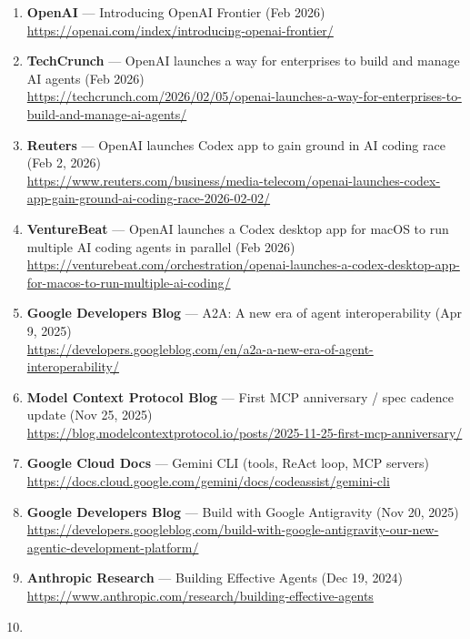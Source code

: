 \documentclass[11pt]{article}
\begin{document}
\begin{enumerate}
\def\labelenumi{\arabic{enumi}.}
\tightlist
\item
  \textbf{OpenAI} --- Introducing OpenAI Frontier (Feb 2026)\\
  \url{https://openai.com/index/introducing-openai-frontier/}
\item
  \textbf{TechCrunch} --- OpenAI launches a way for enterprises to build
  and manage AI agents (Feb 2026)\\
  \url{https://techcrunch.com/2026/02/05/openai-launches-a-way-for-enterprises-to-build-and-manage-ai-agents/}
\item
  \textbf{Reuters} --- OpenAI launches Codex app to gain ground in AI
  coding race (Feb 2, 2026)\\
  \url{https://www.reuters.com/business/media-telecom/openai-launches-codex-app-gain-ground-ai-coding-race-2026-02-02/}
\item
  \textbf{VentureBeat} --- OpenAI launches a Codex desktop app for macOS
  to run multiple AI coding agents in parallel (Feb 2026)\\
  \url{https://venturebeat.com/orchestration/openai-launches-a-codex-desktop-app-for-macos-to-run-multiple-ai-coding/}
\item
  \textbf{Google Developers Blog} --- A2A: A new era of agent
  interoperability (Apr 9, 2025)\\
  \url{https://developers.googleblog.com/en/a2a-a-new-era-of-agent-interoperability/}
\item
  \textbf{Model Context Protocol Blog} --- First MCP anniversary / spec
  cadence update (Nov 25, 2025)\\
  \url{https://blog.modelcontextprotocol.io/posts/2025-11-25-first-mcp-anniversary/}
\item
  \textbf{Google Cloud Docs} --- Gemini CLI (tools, ReAct loop, MCP
  servers)\\
  \url{https://docs.cloud.google.com/gemini/docs/codeassist/gemini-cli}
\item
  \textbf{Google Developers Blog} --- Build with Google Antigravity (Nov
  20, 2025)\\
  \url{https://developers.googleblog.com/build-with-google-antigravity-our-new-agentic-development-platform/}
\item
  \textbf{Anthropic Research} --- Building Effective Agents (Dec 19,
  2024)\\
  \url{https://www.anthropic.com/research/building-effective-agents}
\item

\end{enumerate}
\end{document}
